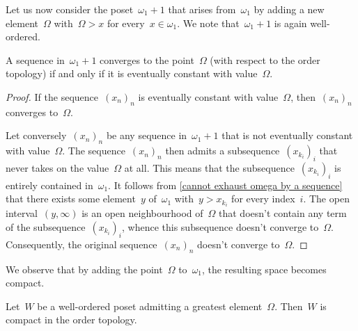 Let us now consider the poset~$ω_1 + 1$ that arises from~$ω_1$ by adding a new element~$Ω$ with~$Ω > x$ for every~$x ∈ ω_1$.
We note that~$ω_1 + 1$ is again well-ordered.

\begin{corollary}
	\label{Omega is not a limit from below}
	A sequence in~$ω_1 + 1$ converges to the point~$Ω$ (with respect to the order topology) if and only if it is eventually constant with value~$Ω$.
\end{corollary}

\begin{proof}
	If the sequence~$(x_n)_n$ is eventually constant with value~$Ω$, then~$(x_n)_n$ converges to~$Ω$.

	Let conversely~$(x_n)_n$ be any sequence in~$ω_1 + 1$ that is not eventually constant with value~$Ω$.
	The sequence~$(x_n)_n$ then admits a subsequence~$(x_{k_i})_i$ that never takes on the value~$Ω$ at all.
	This means that the subsequence~$(x_{k_i})_i$ is entirely contained in~$ω_1$.
	It follows from \cref{cannot exhaust omega by a sequence} that there exists some element~$y$ of~$ω_1$ with~$y > x_{k_i}$ for every index~$i$.
	The open interval~$(y, ∞)$ is an open neighbourhood of~$Ω$ that doesn’t contain any term of the subsequence~$(x_{k_i})_i$, whence this subsequence doesn’t converge to~$Ω$.
	Consequently, the original sequence~$(x_n)_n$ doesn’t converge to~$Ω$.
\end{proof}

We observe that by adding the point~$Ω$ to~$ω_1$, the resulting space becomes compact.

\begin{lemma}
	\label{compactness of bounded ordinals}
	Let~$W$ be a well-ordered poset admitting a greatest element~$Ω$.
	Then~$W$ is compact in the order topology.
\end{lemma}

